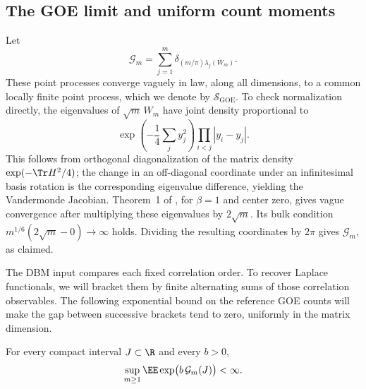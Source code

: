 \subsection{The GOE limit and uniform count moments}

Let
\[
 \mathcal G_m=\sum_{j=1}^m
       \delta_{(m/\pi)\lambda_j(W_m)}.
\]
These point processes converge vaguely in law, along all dimensions,
to a common locally finite point process, which we denote by
\(\mathcal S_{\mathrm{GOE}}\). To check normalization directly,
the eigenvalues of \(\sqrt m\,W_m\) have joint density proportional to
\[
 \exp\left(-\frac14\sum_j y_j^2\right)
       \prod_{i<j}|y_i-y_j|.
\]
This follows from orthogonal diagonalization of the matrix density
\(\exp(-\Tr H^2/4)\); the change in an off-diagonal coordinate under
an infinitesimal basis rotation is the corresponding eigenvalue
difference, yielding the Vandermonde Jacobian.
Theorem~1 of \citet{ValkoVirag}, for \(\beta=1\) and center zero,
gives vague convergence after multiplying these eigenvalues by
\(2\sqrt m\). Its bulk condition
\(m^{1/6}(2\sqrt m-0)\to\infty\) holds. Dividing the resulting
coordinates by \(2\pi\) gives \(\mathcal G_m\), as claimed.

The DBM input compares each fixed correlation order. To recover Laplace
functionals, we will bracket them by finite alternating sums of those
correlation observables. The following exponential bound on the reference
GOE counts will make the gap between successive brackets tend to zero,
uniformly in the matrix dimension.

\begin{lemma}
\label{lem:goe-counts}
For every compact interval \(J\subset\R\) and every \(b>0\),
\[
 \sup_{m\ge1}\EE\exp\bigl(b\,\mathcal G_m(J)\bigr)<\infty.
\]
\end{lemma}

